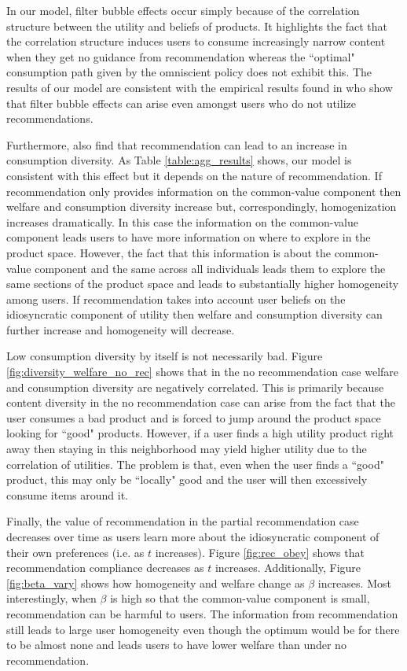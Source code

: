 \documentclass[sigconf]{acmart}
\begin{document}
In our model, filter bubble effects occur simply because of the correlation structure between the utility and beliefs of products. It highlights the fact that the correlation structure induces users to consume increasingly narrow content when they get no guidance from recommendation whereas the ``optimal" consumption path given by the omniscient policy does not exhibit this. The results of our model are consistent with the empirical results found in \cite{nguyen2014exploring} who show that filter bubble effects can arise even amongst users who do not utilize recommendations.
\par
Furthermore, \cite{nguyen2014exploring} also find that recommendation can lead to an increase in consumption diversity. As Table \ref{table:agg_results} shows, our model is consistent with this effect but it depends on the nature of recommendation. If recommendation only provides information on the common-value component then welfare and consumption diversity increase but, correspondingly, homogenization increases dramatically. In this case the information on the common-value component leads users to have more information on where to explore in the product space. However, the fact that this information is about the common-value component and the same across all individuals leads them to explore the same sections of the product space and leads to substantially higher homogeneity among users. If recommendation takes into account user beliefs on the idiosyncratic  component of utility then welfare and consumption diversity can further increase and homogeneity will decrease.
\par
Low consumption diversity by itself is not necessarily bad. Figure \ref{fig:diversity_welfare_no_rec} shows that in the no recommendation case welfare and consumption diversity are negatively correlated. This is primarily because content diversity in the no recommendation case can arise from the fact that the user consumes a bad product and is forced to jump around the product space looking for ``good" products. However, if a user finds a high utility product right away then staying in this neighborhood may yield higher utility due to the correlation of utilities. The problem is that, even when the user finds a ``good" product, this may only be ``locally" good and the user will then excessively consume items around it.
\par
Finally, the value of recommendation in the partial recommendation case decreases over time as users learn more about the idiosyncratic component of their own preferences (i.e. as $t$ increases). Figure \ref{fig:rec_obey} shows that recommendation compliance decreases as $t$ increases. Additionally, Figure \ref{fig:beta_vary} shows how homogeneity and welfare change as $\beta$ increases. Most interestingly, when $\beta$ is high so that the common-value component is small, recommendation can be harmful to users. The information from recommendation still leads to large user homogeneity even though the optimum would be for there to be almost none and leads users to have lower welfare than under no recommendation.
\end{document}
